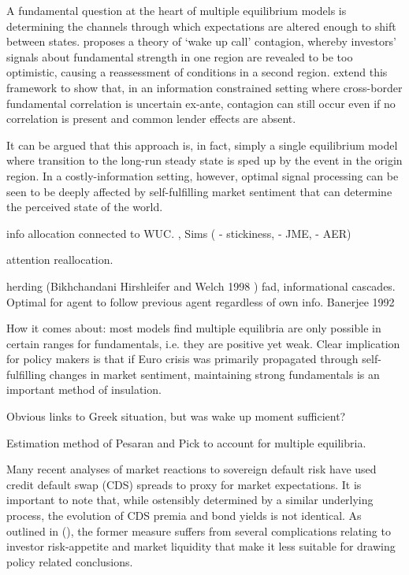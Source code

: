 \documentclass[../base.tex]{subfiles}
\begin{document}


A fundamental question at the heart of multiple equilibrium models is determining the channels through which expectations are altered enough to shift between states. \cite{goldstein1998asian} proposes a theory of `wake up call' contagion, whereby investors' signals about fundamental strength in one region are revealed to be too optimistic, causing a reassessment of conditions in a second region. \cite{ahnert2015wake} extend this framework to show that, in an information constrained setting where cross-border fundamental correlation is uncertain ex-ante, contagion can still occur even if no correlation is present and common lender effects are absent. 

It can be argued that this approach is, in fact, simply a single equilibrium model where transition to the long-run steady state is sped up by the event in the origin region. In a costly-information setting, however, optimal signal processing can be seen to be deeply affected by self-fulfilling market sentiment that can determine the perceived state of the world.



info allocation connected to WUC. \cite{coibion2010information}, Sims (\cite{sims1998stickiness} - stickiness, \cite{sims2003implications} - JME, \cite{sims2006rational} - AER)


\cite{mondria2013financial} attention reallocation. 

herding (Bikhchandani Hirshleifer and Welch 1998 \cite{bikhchandani1992theory}) fad, informational cascades. Optimal for agent to follow previous agent regardless of own info. Banerjee 1992

How it comes about: most models find multiple equilibria are only possible in certain ranges for fundamentals, i.e. they are positive yet weak. Clear implication for policy makers is that if Euro crisis was primarily propagated through self-fulfilling changes in market sentiment, maintaining strong fundamentals is an important method of insulation. 


Obvious links to Greek situation, but was wake up moment sufficient?

Estimation method of Pesaran and Pick to account for multiple equilibria.


Many recent analyses of market reactions to sovereign default risk have used credit default swap (CDS) spreads to proxy for market expectations. It is important to note that, while ostensibly determined by a similar underlying process, the evolution of CDS premia and bond yields is not identical. As outlined in  (\cite{fontana2010analysis}), the former measure suffers from several complications relating to investor risk-appetite and market liquidity that make it less suitable for drawing policy related conclusions.
\end{document}
